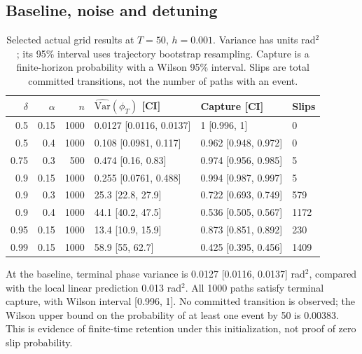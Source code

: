\documentclass[11pt,a4paper]{article}
\begin{document}
\subsection{Baseline, noise and detuning}
\begin{table}[htbp]\centering\small
\setlength{\tabcolsep}{4pt}
\begin{tabular}{rrrlll}\toprule
$\delta$ & $\alpha$ & $n$ & $\widehat{\mathrm{Var}}(\phi_T)$ [CI] & Capture [CI] & Slips \\ \midrule
0.5 & 0.15 & 1000 & 0.0127 [0.0116, 0.0137] & 1 [0.996, 1] & 0 \\
0.5 & 0.4 & 1000 & 0.108 [0.0981, 0.117] & 0.962 [0.948, 0.972] & 0 \\
0.75 & 0.3 & 500 & 0.474 [0.16, 0.83] & 0.974 [0.956, 0.985] & 5 \\
0.9 & 0.15 & 1000 & 0.255 [0.0761, 0.488] & 0.994 [0.987, 0.997] & 5 \\
0.9 & 0.3 & 1000 & 25.3 [22.8, 27.9] & 0.722 [0.693, 0.749] & 579 \\
0.9 & 0.4 & 1000 & 44.1 [40.2, 47.5] & 0.536 [0.505, 0.567] & 1172 \\
0.95 & 0.15 & 1000 & 13.4 [10.9, 15.9] & 0.873 [0.851, 0.892] & 230 \\
0.99 & 0.15 & 1000 & 58.9 [55, 62.7] & 0.425 [0.395, 0.456] & 1409 \\
\bottomrule\end{tabular}
\caption{Selected actual grid results at $T=50$, $h=0.001$. Variance has units rad$^2$; its 95\% interval uses trajectory bootstrap resampling. Capture is a finite-horizon probability with a Wilson 95\% interval. Slips are total committed transitions, not the number of paths with an event.}
\label{tab:grid}
\end{table}
At the baseline, terminal phase variance is 0.0127 [0.0116, 0.0137] rad$^2$, compared with the local linear prediction 0.013 rad$^2$. All 1000 paths satisfy terminal capture, with Wilson interval [0.996, 1]. No committed transition is observed; the Wilson upper bound on the probability of at least one event by 50 is 0.00383. This is evidence of finite-time retention under this initialization, not proof of zero slip probability.
\end{document}
